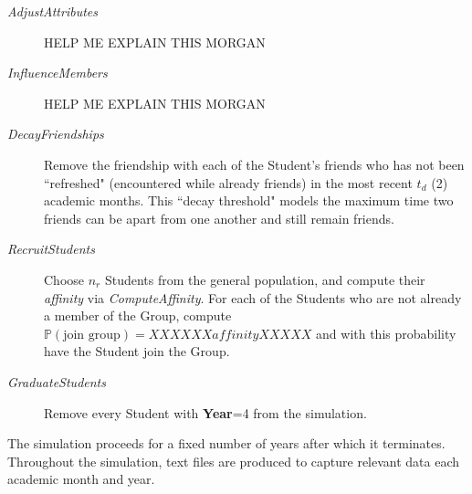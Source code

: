 \begin{description}
\item[\textsl{AdjustAttributes}] HELP ME EXPLAIN THIS MORGAN

\item[\textsl{InfluenceMembers}] HELP ME EXPLAIN THIS MORGAN

\item[\textsl{DecayFriendships}] Remove the friendship with each of the
Student's friends who has not been ``refreshed" (encountered while already
friends) in the most recent $t_d$ (2) academic months. This ``decay threshold"
models the maximum time two friends can be apart from one another and still
remain friends.

\item[\textsl{RecruitStudents}] Choose $n_r$ Students from the general population, and
compute their \textit{affinity} via \textsl{ComputeAffinity}. For each of the
Students who are not already a member of the Group, compute 
$\mathbb{P}(\text{join group})=XXXXXX  \textit{affinity} XXXXX$
and with this probability have the Student join the Group.

\item[\textsl{GraduateStudents}] Remove every Student with \textbf{Year}=4 from the
simulation.

\end{description}

The simulation proceeds for a fixed number of years after which it terminates.
Throughout the simulation, text files are produced to capture relevant data
each academic month and year.

% 
% 
% 
% 
% 
